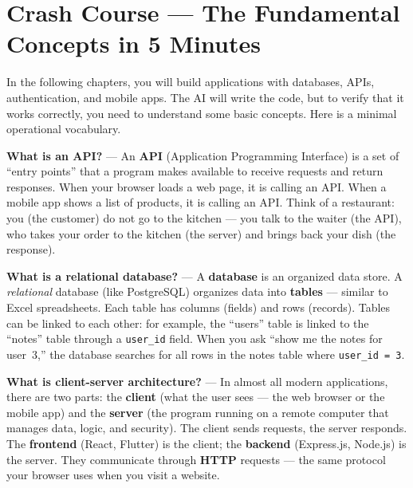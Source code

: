 \section*{Crash Course --- The Fundamental Concepts in 5 Minutes}

In the following chapters, you will build applications with databases, APIs, authentication, and mobile apps. The AI will write the code, but to verify that it works correctly, you need to understand some basic concepts. Here is a minimal operational vocabulary.

\begin{notebox}
\textbf{What is an API?} --- An \textbf{API} (Application Programming Interface) is a set of ``entry points'' that a program makes available to receive requests and return responses. When your browser loads a web page, it is calling an API. When a mobile app shows a list of products, it is calling an API. Think of a restaurant: you (the customer) do not go to the kitchen --- you talk to the waiter (the API), who takes your order to the kitchen (the server) and brings back your dish (the response).
\end{notebox}

\begin{notebox}
\textbf{What is a relational database?} --- A \textbf{database} is an organized data store. A \textit{relational} database (like PostgreSQL) organizes data into \textbf{tables} --- similar to Excel spreadsheets. Each table has columns (fields) and rows (records). Tables can be linked to each other: for example, the ``users'' table is linked to the ``notes'' table through a \texttt{user\_id} field. When you ask ``show me the notes for user~3,'' the database searches for all rows in the notes table where \texttt{user\_id = 3}.
\end{notebox}

\begin{notebox}
\textbf{What is client-server architecture?} --- In almost all modern applications, there are two parts: the \textbf{client} (what the user sees --- the web browser or the mobile app) and the \textbf{server} (the program running on a remote computer that manages data, logic, and security). The client sends requests, the server responds. The \textbf{frontend} (React, Flutter) is the client; the \textbf{backend} (Express.js, Node.js) is the server. They communicate through \textbf{HTTP} requests --- the same protocol your browser uses when you visit a website.
\end{notebox}


